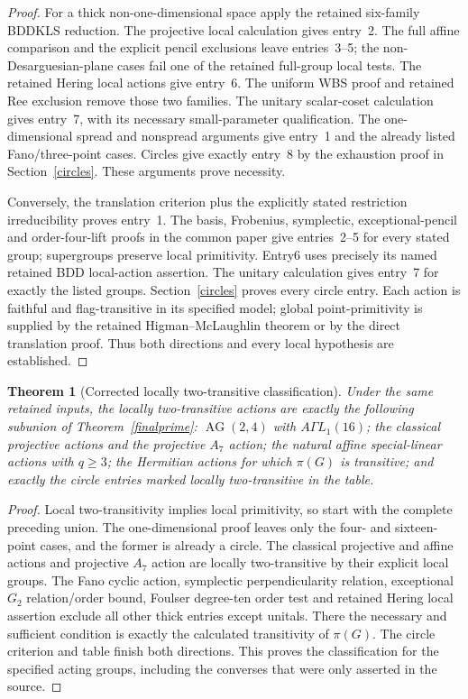 \documentclass[11pt,a4paper]{article}
\newtheorem{theorem}{Theorem}[section]
\begin{document}
\begin{proof}
For a thick non-one-dimensional space apply the retained six-family
BDDKLS reduction. The projective local calculation gives entry~2.
The full affine comparison and the explicit pencil exclusions leave
entries~3--5; the non-Desarguesian-plane cases fail one of the retained
full-group local tests. The retained Hering local actions give entry~6.
The uniform WBS proof and retained Ree exclusion remove those two
families. The unitary scalar-coset calculation gives entry~7, with
its necessary small-parameter qualification. The one-dimensional
spread and nonspread arguments give entry~1 and the already listed
Fano/three-point cases. Circles give exactly entry~8 by the exhaustion
proof in Section~\ref{circles}. These arguments prove necessity.

Conversely, the translation criterion plus the explicitly stated
restriction irreducibility proves entry~1. The basis, Frobenius,
symplectic, exceptional-pencil and order-four-lift proofs in the common
paper give entries~2--5 for every stated group; supergroups preserve
local primitivity. Entry6 uses precisely its named retained BDD
local-action assertion. The unitary calculation gives entry~7 for
exactly the listed groups. Section~\ref{circles} proves every circle
entry. Each action is faithful and flag-transitive in its specified
model; global point-primitivity is supplied by the retained
Higman--McLaughlin theorem or by the direct translation proof.
Thus both directions and every local hypothesis are established.
\end{proof}

\begin{theorem}[Corrected locally two-transitive classification]\label{final2t}
Under the same retained inputs, the locally two-transitive actions are
exactly the following subunion of Theorem~\ref{finalprime}:
$\operatorname{AG}(2,4)$ with $A\Gamma L_1(16)$;
the classical projective actions and the projective $A_7$ action;
the natural affine special-linear actions with $q\geq3$;
the Hermitian actions for which $\pi(G)$ is transitive;
and exactly the circle entries marked locally two-transitive in the table.
\end{theorem}
\begin{proof}
Local two-transitivity implies local primitivity, so start with the
complete preceding union. The one-dimensional proof leaves only the
four- and sixteen-point cases, and the former is already a circle.
The classical projective and affine actions and projective $A_7$
action are locally two-transitive by their explicit local groups.
The Fano cyclic action, symplectic perpendicularity relation, exceptional
$G_2$ relation/order bound, Foulser degree-ten order test and retained
Hering local assertion exclude all other thick entries except unitals.
There the necessary and sufficient condition is exactly the calculated
transitivity of $\pi(G)$. The circle criterion and table finish both
directions. This proves the classification for the specified acting
groups, including the converses that were only asserted in the source.
\end{proof}
\end{document}
